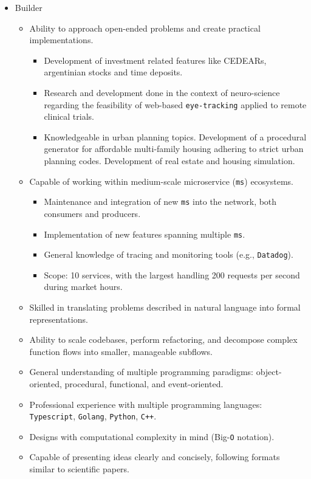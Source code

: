 \documentclass[a4paper]{article}
\begin{document}
\begin{itemize}
  \item Builder
  \begin{itemize}
    \item Ability to approach open-ended problems and create practical implementations.
    \begin{itemize}
      \item Development of investment related features like CEDEARs, argentinian stocks and time deposits.
      \item Research and development done in the context of neuro-science regarding the feasibility of web-based \texttt{eye-tracking} applied to remote clinical trials.
      \item Knowledgeable in urban planning topics. Development of a procedural generator for affordable multi-family housing adhering to strict urban planning codes. Development of real estate and housing simulation.
    \end{itemize}
    \item Capable of working within medium-scale microservice (\texttt{ms}) ecosystems.
    \begin{itemize}
      \item Maintenance and integration of new \texttt{ms} into the network, both consumers and producers.
      \item Implementation of new features spanning multiple \texttt{ms}.
      \item General knowledge of tracing and monitoring tools (e.g., \texttt{Datadog}).
      \item Scope: 10 services, with the largest handling 200 requests per second during market hours.
    \end{itemize}
    \item Skilled in translating problems described in natural language into formal representations.
    \item Ability to scale codebases, perform refactoring, and decompose complex function flows into smaller, manageable subflows.
    \item General understanding of multiple programming paradigms: object-oriented, procedural, functional, and event-oriented.
    \item Professional experience with multiple programming languages: \texttt{Typescript}, \texttt{Golang}, \texttt{Python}, \texttt{C++}.
    \item Designs with computational complexity in mind (Big-\texttt{O} notation).
    \item Capable of presenting ideas clearly and concisely, following formats similar to scientific papers.

\end{itemize}
\end{itemize}
\end{document}
